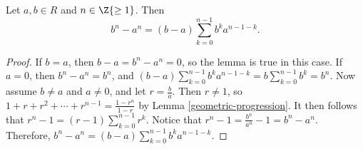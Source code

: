 \documentclass[12pt]{article}
\begin{document}
\begin{lemma}\label{freshmans-reality}
    Let $a, b \in R$ and $n \in \Z{\geq 1}$. Then \[b^n - a^n = (b - a)\sum_{k=0}^{n-1} b^ka^{n-1-k}.\]
\end{lemma}

\begin{proof}
    If $b = a$, then $b - a = b^n - a^n = 0$, so the lemma is true in this case.
    If $a = 0$, then $b^n - a^n = b^n$, and $(b - a)\sum_{k=0}^{n-1} b^ka^{n-1-k} = b\sum_{k=0}^{n-1}b^k = b^n$. Now assume $b \neq a$ and $a \neq 0$, and let $r = \frac{b}{a}$. Then $r \neq 1$, so $1 + r + r^2 + \cdots + r^{n-1} = \frac{1-r^n}{1-r}$ by Lemma \ref{geometric-progression}. It then follows that $r^n-1 = (r-1)\sum_{k=0}^{n-1}r^k$. Notice that $r^n - 1 = \frac{b^n}{a^n} - 1 = b^n - a^n$. Therefore, $b^n - a^n = (b-a)\sum_{k=0}^{n-1}b^ka^{n-1-k}$.
\end{proof}
\end{document}
